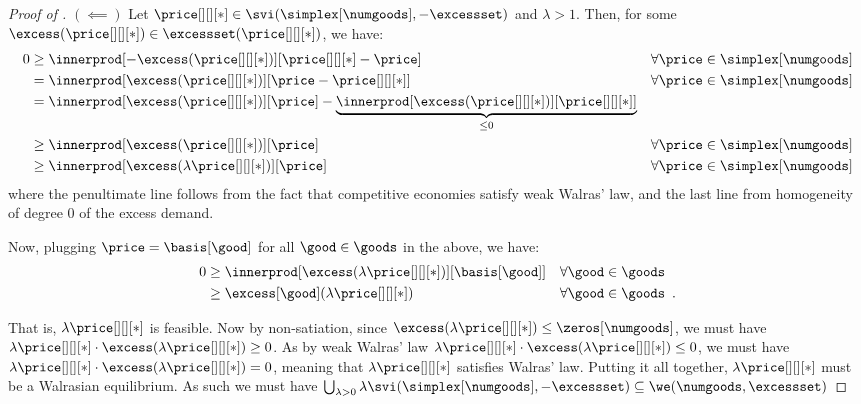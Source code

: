 \begin{proof}[Proof of ]
    $(\impliedby)$
    Let $\price[][][*] \in \svi(\simplex[\numgoods], -\excessset)$ and $\lambda > 1$. Then, for some $\excess(\price[][][*]) \in \excessset(\price[][][*])$, we have:
    \begin{align*}
        0&\geq \innerprod[{-\excess(\price[][][*])}][{\price[][][*] - \price}] && \forall \price \in \simplex[\numgoods] \notag\\
        &= \innerprod[{\excess(\price[][][*])}][{\price - \price[][][*]}] && \forall \price \in \simplex[\numgoods] \notag\\
        &= \innerprod[{\excess(\price[][][*])}][{\price}] - \underbrace{\innerprod[{\excess(\price[][][*])}][{\price[][][*] }]}_{\leq 0} \notag\\
        &\geq \innerprod[{\excess(\price[][][*])}][{\price}] && \forall \price \in \simplex[\numgoods]\\
        &\geq \innerprod[{\excess(\lambda \price[][][*])}][{\price}] && \forall \price \in \simplex[\numgoods]
    \end{align*}
     where the penultimate line follows from the fact that competitive economies satisfy weak Walras' law, and the last line from homogeneity of degree $0$ of the excess demand.

    Now, plugging $\price = \basis[\good]$ for all $\good \in \goods$ in the above, we have:
    \begin{align*}
        0 &\geq \innerprod[{\excess(\lambda \price[][][*])}][{\basis[\good]}] && \forall \good \in \goods \notag\\
        &\geq \excess[\good](\lambda \price[][][*]) && \forall \good \in \goods \notag \enspace .
    \end{align*}

   That is, $\lambda \price[][][*]$ is feasible. Now by non-satiation, since $\excess(\lambda \price[][][*]) \leq \zeros[\numgoods]$, we must have $\lambda \price[][][*] \cdot \excess(\lambda \price[][][*]) \geq 0$. As by weak Walras' law $\lambda \price[][][*] \cdot \excess(\lambda \price[][][*]) \leq 0$, we must have $\lambda \price[][][*] \cdot \excess(\lambda \price[][][*]) = 0$, meaning that $\lambda \price[][][*]$ satisfies Walras' law. Putting it all together, $\lambda \price[][][*]$ must be a Walrasian equilibrium. As such we must have $ \bigcup_{\lambda > 0} \lambda \svi(\simplex[\numgoods], -\excessset) \subseteq \we(\numgoods, \excessset)$
\end{proof}


